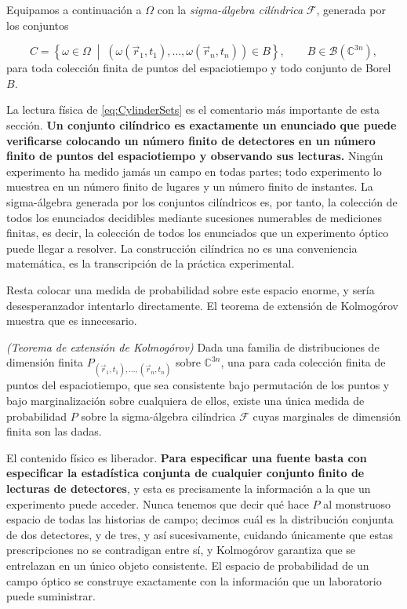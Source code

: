 		Equipamos a continuación a $\Omega$ con la \textit{sigma-álgebra cilíndrica} $\mathcal{F}$, generada por los conjuntos

		\begin{equation}\label{eq:CylinderSets}
			C = \left\{\omega\in\Omega \;\middle|\; \left(\omega(\vec{r}_{1},t_{1}),\dots,\omega(\vec{r}_{n},t_{n})\right)\in B\right\},
			\qquad B\in\mathcal{B}(\mathbb{C}^{3n}),
		\end{equation}
		para toda colección finita de puntos del espaciotiempo y todo conjunto de Borel $B$.

		La lectura física de \eqref{eq:CylinderSets} es el comentario más importante de esta sección. \textbf{Un conjunto cilíndrico es exactamente un enunciado que puede verificarse colocando un número finito de detectores en un número finito de puntos del espaciotiempo y observando sus lecturas.} Ningún experimento ha medido jamás un campo en todas partes; todo experimento lo muestrea en un número finito de lugares y un número finito de instantes. La sigma-álgebra generada por los conjuntos cilíndricos es, por tanto, la colección de todos los enunciados decidibles mediante sucesiones numerables de mediciones finitas, es decir, la colección de todos los enunciados que un experimento óptico puede llegar a resolver. La construcción cilíndrica no es una conveniencia matemática, es la transcripción de la práctica experimental.

		Resta colocar una medida de probabilidad sobre este espacio enorme, y sería desesperanzador intentarlo directamente. El teorema de extensión de Kolmogórov \citep{kolmogorov1933grundbegriffe} muestra que es innecesario.

		\begin{myteo}
			\textit{(Teorema de extensión de Kolmogórov)} Dada una familia de distribuciones de dimensión finita $P_{(\vec{r}_{1},t_{1}),\dots,(\vec{r}_{n},t_{n})}$ sobre $\mathbb{C}^{3n}$, una para cada colección finita de puntos del espaciotiempo, que sea consistente bajo permutación de los puntos y bajo marginalización sobre cualquiera de ellos, existe una única medida de probabilidad $P$ sobre la sigma-álgebra cilíndrica $\mathcal{F}$ cuyas marginales de dimensión finita son las dadas.
		\end{myteo}

		El contenido físico es liberador. \textbf{Para especificar una fuente basta con especificar la estadística conjunta de cualquier conjunto finito de lecturas de detectores}, y esta es precisamente la información a la que un experimento puede acceder. Nunca tenemos que decir qué hace $P$ al monstruoso espacio de todas las historias de campo; decimos cuál es la distribución conjunta de dos detectores, y de tres, y así sucesivamente, cuidando únicamente que estas prescripciones no se contradigan entre sí, y Kolmogórov garantiza que se entrelazan en un único objeto consistente. El espacio de probabilidad de un campo óptico se construye exactamente con la información que un laboratorio puede suministrar.

